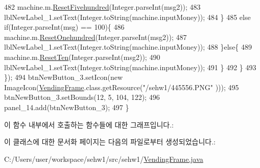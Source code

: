\begin{DoxyCode}
482                     machine.m.\hyperlink{classsehw1_1_1money_abc797993b9f38414e417edbf2166f4e6}{ResetFivehundred}(Integer.parseInt(msg2));
483                     lblNewLabel\_1.setText(Integer.toString(machine.inputMoney));
484                 \}
485                 \textcolor{keywordflow}{else} \textcolor{keywordflow}{if}(Integer.parseInt(msg) == 100)\{
486                     machine.m.\hyperlink{classsehw1_1_1money_a379e0271b048e48d54d7a67754cb28c8}{ResetOnehundred}(Integer.parseInt(msg2));
487                     lblNewLabel\_1.setText(Integer.toString(machine.inputMoney));
488                 \}\textcolor{keywordflow}{else}\{
489                     machine.m.\hyperlink{classsehw1_1_1money_a5c3191090797dd8485b1ac92a23e0eca}{ResetTen}(Integer.parseInt(msg2));
490                     lblNewLabel\_1.setText(Integer.toString(machine.inputMoney));
491                 \}
492             \}
493         \});
494         btnNewButton\_3.setIcon(\textcolor{keyword}{new} ImageIcon(\hyperlink{classsehw1_1_1_vending_frame_a82f3d8fe653c04d594b0a46e751328a0}{VendingFrame}.class.getResource(\textcolor{stringliteral}{"/sehw1/445556.PNG"}
      )));
495         btnNewButton\_3.setBounds(12, 5, 104, 122);
496         panel\_14.add(btnNewButton\_3);
497     \}
\end{DoxyCode}


이 함수 내부에서 호출하는 함수들에 대한 그래프입니다.\+:




이 클래스에 대한 문서화 페이지는 다음의 파일로부터 생성되었습니다.\+:\begin{DoxyCompactItemize}
\item 
C\+:/\+Users/user/workspace/sehw1/src/sehw1/\hyperlink{_vending_frame_8java}{Vending\+Frame.\+java}\end{DoxyCompactItemize}
